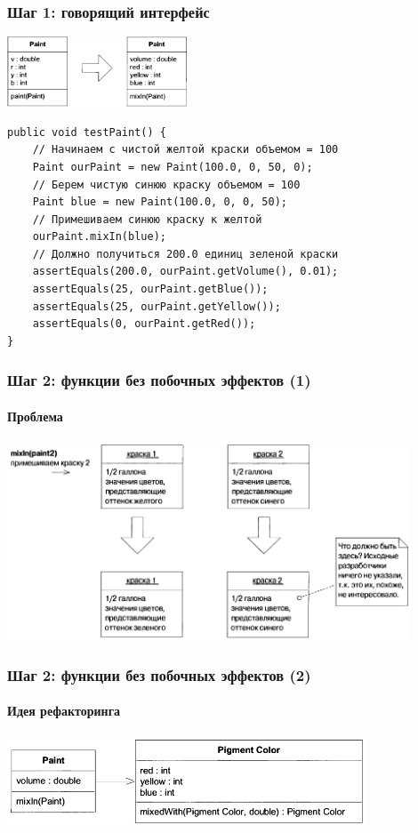 \documentclass{../../slides-style}
\begin{document}
	\begin{frame}[fragile]
		\frametitle{Шаг 1: говорящий интерфейс}
		\begin{center}
			\includegraphics[width=0.4\textwidth]{informativeInterfaceForPaint.png}
		\end{center}
		\begin{footnotesize}
			\begin{verbatim}
public void testPaint() {
    // Начинаем с чистой желтой краски объемом = 100
    Paint ourPaint = new Paint(100.0, 0, 50, 0);
    // Берем чистую синюю краску объемом = 100
    Paint bluе = new Paint(100.0, 0, 0, 50);
    // Примешиваем синюю краску к желтой
    ourPaint.mixIn(blue); 
    // Должно получиться 200.0 единиц зеленой краски
    assertEquals(200.0, ourPaint.getVolume(), 0.01);
    assertEquals(25, ourPaint.getBlue());
    assertEquals(25, ourPaint.getYellow());
    assertEquals(0, ourPaint.getRed());
}
			\end{verbatim}
		\end{footnotesize}
\end{frame}

	\begin{frame}
		\frametitle{Шаг 2: функции без побочных эффектов (1)}
		\framesubtitle{Проблема}
		\begin{center}
			\includegraphics[width=0.9\textwidth]{mixinSideEffects.png}
		\end{center}
	\end{frame}

	\begin{frame}
		\frametitle{Шаг 2: функции без побочных эффектов (2)}
		\framesubtitle{Идея рефакторинга}
		\begin{center}
			\includegraphics[width=0.8\textwidth]{pigmentColor.png}
		\end{center}
	\end{frame}
\end{document}
